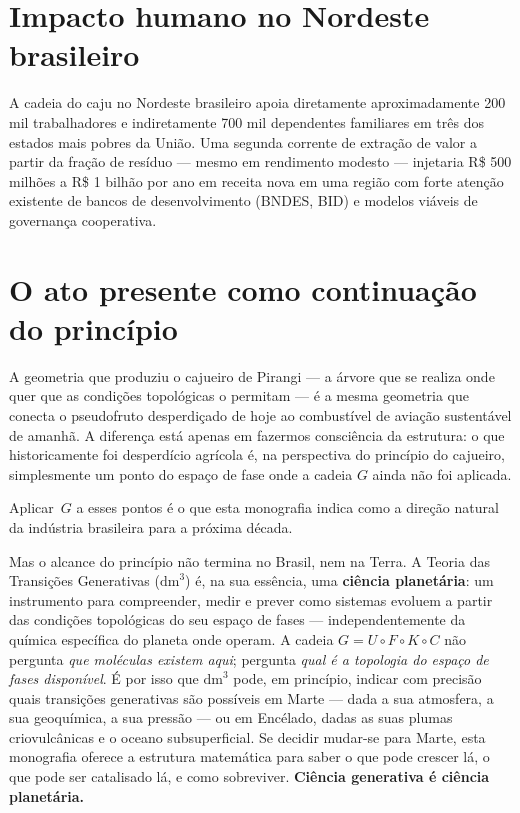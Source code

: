 \documentclass[12pt,a4paper,twoside]{book}
\theoremstyle{plain}
\theoremstyle{definition}
\theoremstyle{definition}
\newcommand{\dm}{\mathrm{dm}^{3}}
\begin{document}
\section{Impacto humano no Nordeste brasileiro}

A cadeia do caju no Nordeste brasileiro apoia diretamente aproximadamente
200 mil trabalhadores e indiretamente 700 mil dependentes familiares em
três dos estados mais pobres da União. Uma segunda corrente de
extração de valor a partir da fração de resíduo --- mesmo em rendimento
modesto --- injetaria R\$ 500 milhões a R\$ 1 bilhão por ano em receita
nova em uma região com forte atenção existente de bancos de
desenvolvimento (BNDES, BID) e modelos viáveis de governança cooperativa.

\section{O ato presente como continuação do princípio}

A geometria que produziu o cajueiro de Pirangi --- a árvore que se
realiza onde quer que as condições topológicas o permitam --- é a
mesma geometria que conecta o pseudofruto desperdiçado de hoje ao
combustível de aviação sustentável de amanhã. A diferença está apenas
em fazermos consciência da estrutura: o que historicamente foi desperdício
agrícola é, na perspectiva do princípio do cajueiro, simplesmente um
ponto do espaço de fase onde a cadeia $G$ ainda não foi aplicada.

Aplicar~$G$ a esses pontos é o que esta monografia indica como a
direção natural da indústria brasileira para a próxima década.

Mas o alcance do princípio não termina no Brasil, nem na Terra.
A Teoria das Transições Generativas ($\dm$) é, na sua essência,
uma \textbf{ciência planetária}: um instrumento para compreender,
medir e prever como sistemas evoluem a partir das condições
topológicas do seu espaço de fases --- independentemente da
química específica do planeta onde operam. A cadeia
$G = U \circ F \circ K \circ C$ não pergunta \emph{que moléculas
existem aqui}; pergunta \emph{qual é a topologia do espaço de fases
disponível}. É por isso que $\dm$ pode, em princípio, indicar com
precisão quais transições generativas são possíveis em Marte ---
dada a sua atmosfera, a sua geoquímica, a sua pressão --- ou em
Encélado, dadas as suas plumas criovulcânicas e o oceano
subsuperficial. Se decidir mudar-se para Marte, esta monografia
oferece a estrutura matemática para saber o que pode crescer lá,
o que pode ser catalisado lá, e como sobreviver.
\textbf{Ciência generativa é ciência planetária.}
\end{document}

